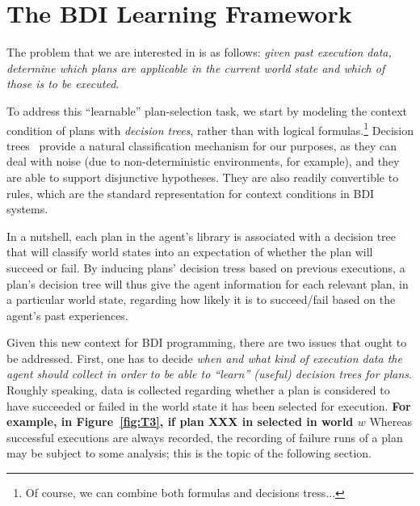 \section{The BDI Learning Framework}\label{sec:framework}


The problem that we are interested in is as follows: \emph{given past execution
data, determine which plans are applicable in the current world state and which
of those is to be executed}.


To address this ``learnable'' plan-selection task, we start by modeling the
context condition of plans with \emph{decision trees}, rather than with logical
formulas.\footnote{Of course, we can combine both formulas and decisions
tress...}
Decision trees~\cite{Mitchell97:ML}  provide a natural classification mechanism
for our purposes, as they can deal with noise (due to non-deterministic
environments, for example), and they are able to support disjunctive hypotheses.
They are also readily convertible to rules, which are the standard representation
for context conditions in BDI systems.




In a nutshell, each plan in the agent's library is associated with a decision
tree that will classify world states into an expectation of whether the plan will
succeed or fail. By inducing plans' decision tress based on previous executions,
a plan's decision tree will thus give the agent information for each relevant
plan, in a particular world state, regarding how likely it is to succeed/fail
based on the agent's past experiences.



Given this new context for BDI programming, there are two issues that ought to be
addressed.
First, one has to decide \emph{when and what kind of execution data the agent should
collect in order to be able to ``learn'' (useful) decision trees for plans}.
Roughly speaking, data is collected regarding whether a plan is considered to
have succeeded or failed in the world state it has been selected for execution.
\textbf{For example, in Figure~\ref{fig:T3}, if plan XXX in selected in world
$w$} %
Whereas successful executions are always recorded, the recording of failure runs
of a plan may be subject to some analysis; this is the topic of the following section.




